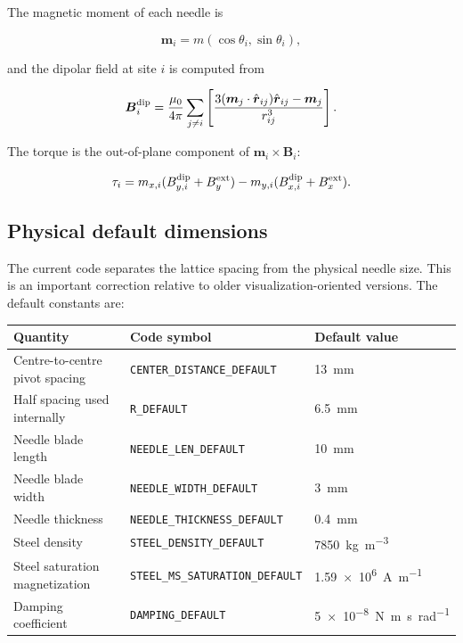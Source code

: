 \documentclass[11pt,a4paper]{article}
\newcommand{\code}[1]{\texttt{#1}}
\newcommand{\vect}[1]{\boldsymbol{#1}}
\begin{document}
The magnetic moment of each needle is

\begin{equation}
\vect m_i = m (\cos\theta_i,\sin\theta_i),
\end{equation}

and the dipolar field at site $i$ is computed from

\begin{equation}
\vect B_i^{\rm dip} = \frac{\mu_0}{4\pi}\sum_{j\ne i}\left[\frac{3(\vect m_j\cdot\hat{\vect r}_{ij})\hat{\vect r}_{ij}-\vect m_j}{r_{ij}^3}\right].
\end{equation}

The torque is the out-of-plane component of $\vect m_i\times\vect B_i$:

\begin{equation}
\tau_i = m_{x,i}(B_{y,i}^{\rm dip}+B_y^{\rm ext}) - m_{y,i}(B_{x,i}^{\rm dip}+B_x^{\rm ext}).
\end{equation}

\subsection{Physical default dimensions}

The current code separates the lattice spacing from the physical needle size. This is an important correction relative to older visualization-oriented versions. The default constants are:

\begin{center}
\begin{tabular}{lll}
\toprule
Quantity & Code symbol & Default value \\
\midrule
Centre-to-centre pivot spacing & \code{CENTER\_DISTANCE\_DEFAULT} & \SI{13}{mm} \\
Half spacing used internally & \code{R\_DEFAULT} & \SI{6.5}{mm} \\
Needle blade length & \code{NEEDLE\_LEN\_DEFAULT} & \SI{10}{mm} \\
Needle blade width & \code{NEEDLE\_WIDTH\_DEFAULT} & \SI{3}{mm} \\
Needle thickness & \code{NEEDLE\_THICKNESS\_DEFAULT} & \SI{0.4}{mm} \\
Steel density & \code{STEEL\_DENSITY\_DEFAULT} & \SI{7850}{kg.m^{-3}} \\
Steel saturation magnetization & \code{STEEL\_MS\_SATURATION\_DEFAULT} & \SI{1.59e6}{A.m^{-1}} \\
Damping coefficient & \code{DAMPING\_DEFAULT} & \SI{5e-8}{N.m.s.rad^{-1}} \\
\bottomrule
\end{tabular}
\end{center}
\end{document}
